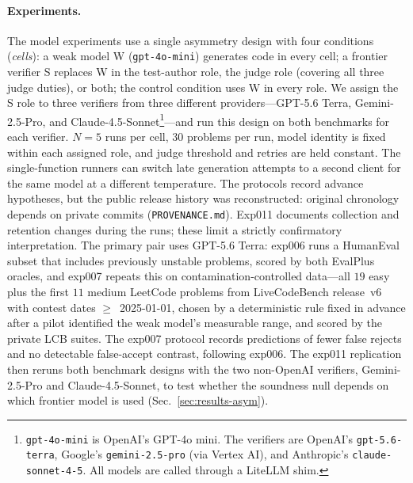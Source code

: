 \documentclass{article}
\begin{document}
\paragraph{Experiments.} The model experiments use a single asymmetry design with four conditions
(\emph{cells}): a weak model W (\texttt{gpt-4o-mini}) generates code in every cell; a frontier
verifier S replaces W in the test-author role, the judge role (covering all three judge duties), or
both; the control condition uses W in every role. We assign the S role to three verifiers from
three different providers---GPT-5.6 Terra, Gemini-2.5-Pro, and Claude-4.5-Sonnet\footnote{\texttt{gpt-4o-mini} is
OpenAI's GPT-4o mini. The verifiers are OpenAI's \texttt{gpt-5.6-terra}, Google's \texttt{gemini-2.5-pro}
(via Vertex AI), and Anthropic's \texttt{claude-sonnet-4-5}. All models are called through a LiteLLM
shim.}---and run this design on both benchmarks for each verifier. $N{=}5$ runs per cell, $30$
problems per run, model identity is fixed within each assigned role, and judge threshold and retries are held
constant. The single-function runners can switch late generation attempts to a second client
for the same model at a different temperature. The protocols record advance hypotheses,
but the public release history was reconstructed: original chronology depends on private
commits (\texttt{PROVENANCE.md}). Exp011 documents collection and retention changes during
the runs; these limit a strictly confirmatory interpretation. The primary pair uses GPT-5.6 Terra: exp006 runs a HumanEval subset that
includes previously unstable problems, scored by both EvalPlus oracles, and exp007 repeats this
on contamination-controlled data---all $19$ easy plus the first $11$ medium LeetCode problems from
LiveCodeBench release~v6 with contest dates $\geq$~2025-01-01, chosen by a deterministic rule fixed
in advance after a pilot identified the weak model's measurable range, and scored by the private LCB
suites. The exp007 protocol records predictions of fewer false rejects and no detectable
false-accept contrast, following exp006. The exp011 replication then reruns
both benchmark designs with the two non-OpenAI verifiers, Gemini-2.5-Pro and Claude-4.5-Sonnet, to
test whether the soundness null depends on which frontier model is used (Sec.~\ref{sec:results-asym}).
\end{document}
